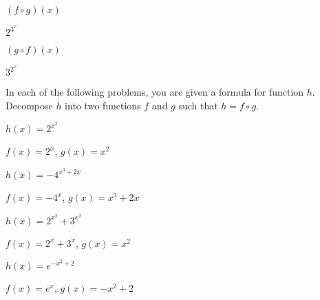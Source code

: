 \begin{exercises}
\begin{problem}[Composition]
\begin{multicols}{3}
\begin{subproblem}
	\end{subproblem}
	\begin{subproblem}
		$(f\circ g)(x)$
		\begin{shortsolution}
			$2^{3^x}$ 
		\end{shortsolution}
	\end{subproblem}
	\begin{subproblem}
		$(g\circ f)(x)$
		\begin{shortsolution}
			$3^{2^x}$ 
		\end{shortsolution}
	\end{subproblem}
\end{multicols}
\end{problem}
\begin{problem}[Decomposition]
In each of the following problems, you are given a formula for function  
$h$. Decompose $h$ into two functions $f$ and $g$ such that $h=f\circ g$.
\begin{multicols}{4}
	\begin{subproblem}
		$h(x)=2^{x^2}$
		\begin{shortsolution}
			$f(x)=2^x$, $g(x)=x^2$ 
		\end{shortsolution}
	\end{subproblem}
	\begin{subproblem}
		$h(x)=-4^{x^3+2x}$
		\begin{shortsolution}
			$f(x)=-4^x$, $g(x)=x^3+2x$ 
		\end{shortsolution}
	\end{subproblem}
	\begin{subproblem}
		$h(x)=2^{x^2}+3^{x^2}$
		\begin{shortsolution}
			$f(x)=2^x+3^x$, $g(x)=x^2$
		\end{shortsolution}
	\end{subproblem}
	\begin{subproblem}
		$h(x)=e^{-x^2+2}$
		\begin{shortsolution}
			$f(x)=e^x$, $g(x)=-x^2+2$ 
		\end{shortsolution}
	\end{subproblem}
\end{multicols}
\end{problem}
\begin{problem}

\end{problem}
\end{exercises}
